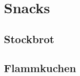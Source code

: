 
\section{Snacks}\label{sec:snacks}

\subsection{Stockbrot}\label{subsec:stockbrot}
\subsection{Flammkuchen}\label{subsec:flammkuchen}

